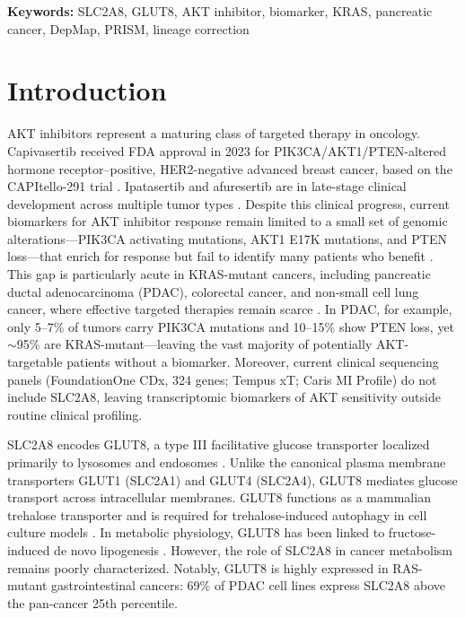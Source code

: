 \documentclass[12pt]{article}
\begin{document}
\textbf{Keywords:} SLC2A8, GLUT8, AKT inhibitor, biomarker, KRAS,
pancreatic cancer, DepMap, PRISM, lineage correction

\newpage

\section{Introduction}

AKT inhibitors represent a maturing class of targeted therapy in oncology.
Capivasertib received FDA approval in 2023 for PIK3CA/AKT1/PTEN-altered
hormone receptor--positive, HER2-negative advanced breast cancer, based
on the CAPItello-291 trial \citep{Turner2023}. Ipatasertib and afuresertib
are in late-stage clinical development across multiple tumor types
\citep{Coleman2021}. Despite this clinical progress, current biomarkers for
AKT inhibitor response remain limited to a small set of genomic
alterations---PIK3CA activating mutations, AKT1 E17K mutations, and PTEN
loss---that enrich for response but fail to identify many patients who
benefit \citep{Davies2012}. This gap is particularly acute in KRAS-mutant cancers, including
pancreatic ductal adenocarcinoma (PDAC), colorectal cancer, and non-small
cell lung cancer, where effective targeted therapies remain scarce
\citep{Waters2018, Prior2020}. In PDAC, for example, only 5--7\% of tumors
carry PIK3CA mutations and 10--15\% show PTEN loss, yet $\sim$95\% are
KRAS-mutant---leaving the vast majority of potentially AKT-targetable patients
without a biomarker. Moreover, current clinical sequencing panels
(FoundationOne CDx, 324 genes; Tempus xT; Caris MI Profile) do not
include SLC2A8, leaving transcriptomic biomarkers of AKT sensitivity
outside routine clinical profiling.

SLC2A8 encodes GLUT8, a type III facilitative glucose transporter
localized primarily to lysosomes and endosomes \citep{Mueckler2013}. Unlike
the canonical plasma membrane transporters GLUT1 (SLC2A1) and GLUT4
(SLC2A4), GLUT8 mediates glucose transport across intracellular
membranes. GLUT8 functions as a mammalian trehalose transporter and is
required for trehalose-induced autophagy in cell culture models
\citep{Mayer2016}. In metabolic physiology, GLUT8 has been linked to
fructose-induced de novo lipogenesis \citep{DeBosch2014}. However, the
role of SLC2A8 in cancer metabolism remains poorly characterized.
Notably, GLUT8 is highly expressed in RAS-mutant gastrointestinal cancers:
69\% of PDAC cell lines express SLC2A8 above the pan-cancer 25th
percentile.
\end{document}

